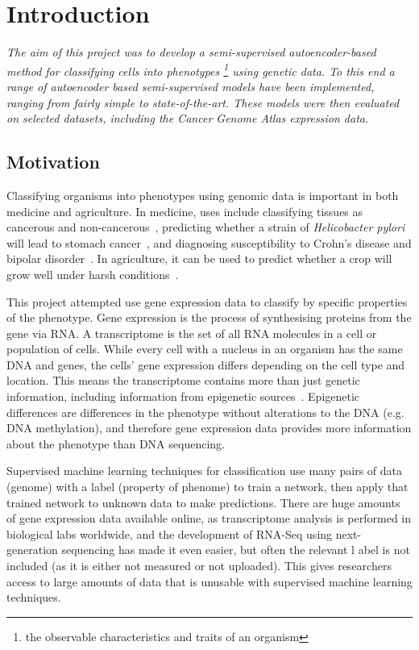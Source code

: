 \chapter{Introduction}

\textit{The aim of this project was to develop a semi-supervised autoencoder-based method for classifying 
cells into phenotypes \footnote{the observable characteristics and traits of an organism} using genetic data. To this end a range 
of autoencoder based semi-supervised models have been implemented, 
ranging from fairly simple to state-of-the-art. These models were then evaluated on selected datasets, including 
the Cancer Genome Atlas expression data.}

\section{Motivation}

Classifying organisms into phenotypes using genomic data is important in both medicine and agriculture. In medicine, uses include 
classifying tissues as cancerous and non-cancerous~\cite{Li2017}, predicting whether a strain of \textit{Helicobacter pylori} will lead to 
stomach cancer~\cite{helicobacter}, and diagnosing susceptibility to Crohn's disease and bipolar disorder~\cite{doi:10.1002/humu.23280}.
In agriculture, it can be used to predict whether a crop will grow well under harsh conditions~\cite{cimmyt}.

This project attempted use gene expression data to classify by specific properties of the phenotype. Gene expression is the process of synthesising 
proteins from the gene via RNA. A transcriptome is the set of all RNA 
molecules in a cell or population of cells. While every cell with a nucleus in an organism has the same DNA and genes, the cells'
gene expression differs depending on the cell type and location. This means the
transcriptome contains more than just genetic information, including information from epigenetic sources~\cite{Gibney2010}. Epigenetic differences are differences
in the phenotype without alterations to the DNA (e.g. DNA methylation), and therefore gene expression data provides more information about 
the phenotype than DNA sequencing.

Supervised machine learning techniques for classification use many pairs of data (genome) with a label
(property of phenome) to train a network, then apply that trained network to unknown data to make predictions. 
There are huge amounts of gene expression data available online, as transcriptome analysis is performed in biological labs worldwide, 
and the development of RNA-Seq using next-generation sequencing has made it even easier, but often the relevant l
abel is not included (as it is either not measured or not uploaded). This gives researchers access to large 
amounts of data that is unusable with supervised machine learning techniques.

